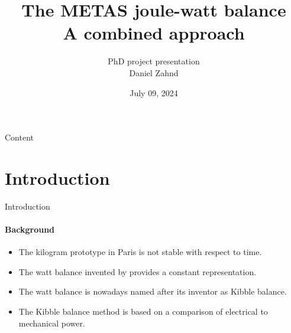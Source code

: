 \documentclass{beamer}
\title{The METAS joule-watt balance \\  \vspace{0.4cm} \small A combined approach}
\author{\scriptsize PhD project presentation \\ \vspace{0.5cm} \normalsize Daniel Zahnd}
\date{July 09, 2024}
\begin{document}
\begin{frame}
\maketitle
\end{frame}
\setcounter{framenumber}{0}

\setlength{\parskip}{2pt}
\begin{frame}{Content}
\tableofcontents
\end{frame}
\setlength{\parskip}{8pt}

\section{Introduction}
\begin{frame}[allowframebreaks]{Introduction}
\framesubtitle{Background}
\begin{itemize}
    \item The kilogram prototype in Paris is not stable with respect to time.
    \item The watt balance invented by \cite{Kibble1976} provides a constant representation.
    \item The watt balance is nowadays named after its inventor as Kibble balance.
    \item The Kibble balance method is based on a comparison of electrical to mechanical power.
    \end{itemize}
\end{frame}
\end{document}
